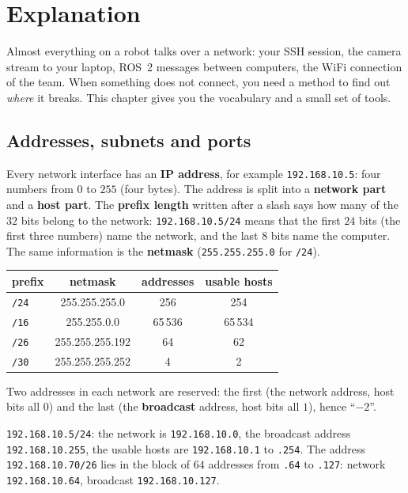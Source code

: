 \label{ch:linux7}

\section*{Explanation}
Almost everything on a robot talks over a network: your SSH session, the camera stream to your laptop, ROS~2 messages between computers, the WiFi connection of the team. When something does not connect, you need a method to find out \emph{where} it breaks. This chapter gives you the vocabulary and a small set of tools.

\subsection*{Addresses, subnets and ports}
Every network interface has an \textbf{IP address}, for example \texttt{192.168.10.5}: four numbers from $0$ to $255$ (four bytes). The address is split into a \textbf{network part} and a \textbf{host part}. The \textbf{prefix length} written after a slash says how many of the $32$ bits belong to the network: \texttt{192.168.10.5/24} means that the first $24$ bits (the first three numbers) name the network, and the last $8$ bits name the computer. The same information is the \textbf{netmask} (\texttt{255.255.255.0} for \texttt{/24}).

\begin{center}
\renewcommand{\arraystretch}{1.2}
\begin{tabular}{lccc}
\textbf{prefix} & \textbf{netmask} & \textbf{addresses} & \textbf{usable hosts}\\ \hline
\texttt{/24} & 255.255.255.0 & 256 & 254\\
\texttt{/16} & 255.255.0.0 & 65\,536 & 65\,534\\
\texttt{/26} & 255.255.255.192 & 64 & 62\\
\texttt{/30} & 255.255.255.252 & 4 & 2\\
\end{tabular}
\end{center}
Two addresses in each network are reserved: the first (the network address, host bits all $0$) and the last (the \textbf{broadcast} address, host bits all $1$), hence ``$-2$''.

\begin{example}
\texttt{192.168.10.5/24}: the network is \texttt{192.168.10.0}, the broadcast address \texttt{192.168.10.255}, the usable hosts are \texttt{192.168.10.1} to \texttt{.254}. The address \texttt{192.168.10.70/26} lies in the block of $64$ addresses from \texttt{.64} to \texttt{.127}: network \texttt{192.168.10.64}, broadcast \texttt{192.168.10.127}.
\end{example}

